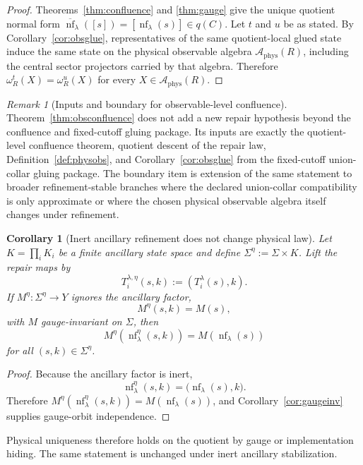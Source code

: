 \documentclass[11pt]{article}
\newtheorem{corollary}[theorem]{Corollary}
\theoremstyle{remark}
\newtheorem{remark}[theorem]{Remark}
\theoremstyle{plain}
\begin{document}
\begin{proof}
Theorems~\ref{thm:confluence} and \ref{thm:gauge} give the unique quotient normal form
\(\overline{\operatorname{nf}}_\lambda([s])=[\operatorname{nf}_\lambda(s)]\in q(C)\). Let
\(t\) and \(u\) be as stated. By Corollary~\ref{cor:obsglue}, representatives of the same
quotient-local glued state induce the same state on the physical observable algebra
\(\mathcal A_{\mathrm{phys}}(R)\), including the central sector projectors carried by that
algebra. Therefore \(\omega_R^t(X)=\omega_R^u(X)\) for every
\(X\in\mathcal A_{\mathrm{phys}}(R)\).
\end{proof}

\begin{remark}[Inputs and boundary for observable-level confluence]\label{rem:obsconfluence}
Theorem~\ref{thm:obsconfluence} does not add a new repair hypothesis beyond the confluence and
fixed-cutoff gluing package. Its inputs are exactly the quotient-level confluence theorem,
quotient descent of the repair law, Definition~\ref{def:physobs}, and
Corollary~\ref{cor:obsglue} from the fixed-cutoff union-collar gluing package. The boundary item
is extension of the same statement to broader refinement-stable branches where the declared
union-collar compatibility is only approximate or where the chosen physical observable algebra
itself changes under refinement.
\end{remark}

\begin{corollary}[Inert ancillary refinement does not change physical law]\label{cor:ancilla}
Let \(K=\prod_i K_i\) be a finite ancillary state space and define \(\Sigma^\eta:=\Sigma\times K\). Lift the repair maps by
\[
T_i^{\lambda,\eta}(s,k):=(T_i^\lambda(s),k).
\]
If \(M^\eta:\Sigma^\eta\to Y\) ignores the ancillary factor,
\[
M^\eta(s,k)=M(s),
\]
with \(M\) gauge-invariant on \(\Sigma\), then
\[
M^\eta(\operatorname{nf}_\lambda^\eta(s,k))
=
M(\operatorname{nf}_\lambda(s))
\]
for all \((s,k)\in\Sigma^\eta\).
\end{corollary}

\begin{proof}
Because the ancillary factor is inert,
\[
\operatorname{nf}_\lambda^\eta(s,k)=\bigl(\operatorname{nf}_\lambda(s),k\bigr).
\]
Therefore \(M^\eta(\operatorname{nf}_\lambda^\eta(s,k))=M(\operatorname{nf}_\lambda(s))\), and Corollary~\ref{cor:gaugeinv} supplies gauge-orbit independence.
\end{proof}

Physical uniqueness therefore holds on the quotient by gauge or implementation hiding. The same
statement is unchanged under inert ancillary stabilization.
\end{document}
